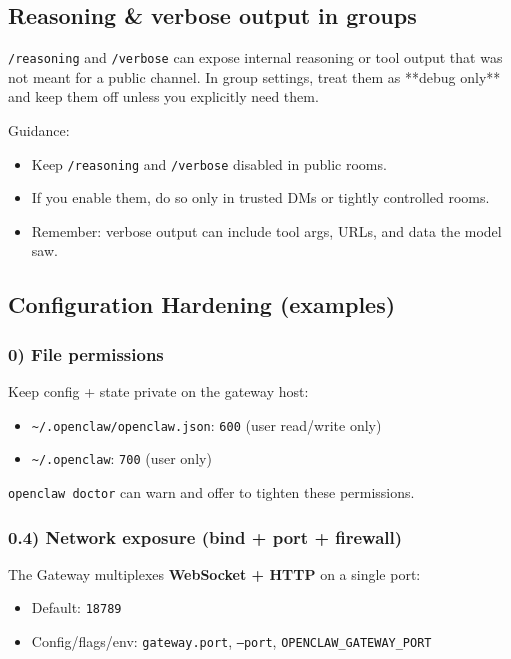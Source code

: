 \subsection{Reasoning \& verbose output in groups}


\texttt{/reasoning} and \texttt{/verbose} can expose internal reasoning or tool output that
was not meant for a public channel. In group settings, treat them as **debug
only** and keep them off unless you explicitly need them.

Guidance:

\begin{itemize}
  \item Keep \texttt{/reasoning} and \texttt{/verbose} disabled in public rooms.
  \item If you enable them, do so only in trusted DMs or tightly controlled rooms.
  \item Remember: verbose output can include tool args, URLs, and data the model saw.
\end{itemize}


\subsection{Configuration Hardening (examples)}


\subsubsection{0) File permissions}


Keep config + state private on the gateway host:

\begin{itemize}
  \item \texttt{\textasciitilde{}/.openclaw/openclaw.json}: \texttt{600} (user read/write only)
  \item \texttt{\textasciitilde{}/.openclaw}: \texttt{700} (user only)
\end{itemize}


\texttt{openclaw doctor} can warn and offer to tighten these permissions.

\subsubsection{0.4) Network exposure (bind + port + firewall)}


The Gateway multiplexes \textbf{WebSocket + HTTP} on a single port:

\begin{itemize}
  \item Default: \texttt{18789}
  \item Config/flags/env: \texttt{gateway.port}, \texttt{--port}, \texttt{OPENCLAW\_GATEWAY\_PORT}
\end{itemize}


